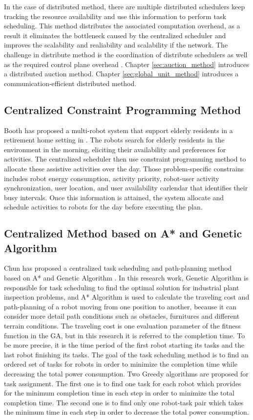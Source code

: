 In the case of distributed method, there are multiple distributed schedulers keep tracking the resource availability and use this information to perform task scheduling\cite{CHRISTODOULOPOULOS20091172}. This method distributes the associated computation overhead, as a result it eliminates the bottleneck caused by the centralized scheduler and improves the scalability and realiability and scalability if the network. The challenge in distribute method is the coordination of distribute schedulers as well as the required control plane overhead \cite{CHRISTODOULOPOULOS20091172}.
Chapter \ref{sec:auction_method} introduces a distributed auction method. Chapter \ref{sec:global_unit_method} introduces a communication-efficient distributed method. 

\subsection{Centralized Constraint Programming Method}
\label{sec:constraint_programming}
Booth has proposed a multi-robot system that support elderly residents in a retirement home setting in  \cite{retire2017}. The robots search for elderly residents in the environment in the morning, eliciting their availability and preferences for activities. The centralized scheduler then use constraint programming method to allocate these assistive activities over the day. Those problem-specific constrains includes robot energy consumption, activity priority, robot-user activity synchronization, user location, and user availability carlendar that identifies their busy intervals. Once this information is attained, the system allocate and schedule activities to robots for the day before executing the plan.

\subsection{Centralized Method based on A* and Genetic Algorithm}
\label{sec:genetic_method}
Chun has proposed a centralized task scheduling and path-planning method based on A* and Genetic Algorithm \cite{Chun12}.
In this research work, Genetic Algorithm is responsible for task scheduling to find the optimal solution for industrial plant inspection problems, and A* Algorithm is used to calculate the traveling cost and path-planning of a robot moving from one position to another, because it can consider more detail path conditions such as obstacles, furnitures and different terrain conditions. The traveling cost is one evaluation parameter of the fitness function in the GA, but in this research it is referred to the completion time. To be more precise, it is the time period of the first robot starting its tasks and the last robot finishing its tasks.
The goal of the task scheduling method is to find an ordered set of tasks for robots in order to minimize the completion time while decreasing the total power consumption.
Two Greedy algorithms are proposed for task assignment. The first one is to find one task for each robot which provides for the minimum completion time in each step in order to minimize the total completion time. The second one is to find only one robot-task pair which takes the minimum time in each step in order to decrease the total power consumption. 

